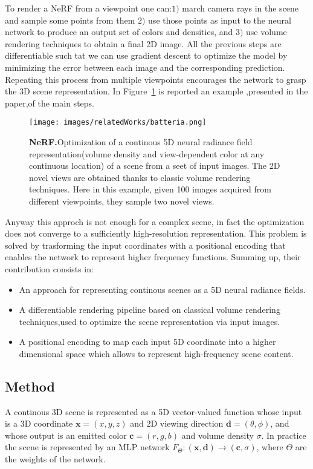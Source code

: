 To render a NeRF from a viewpoint one can:$1)$ march camera rays in the 
scene and sample some points from them $2)$ use those points as input to the neural
network to produce an output set of colors and densities, and $3)$ use volume 
rendering techniques to obtain a final 2D image. All the previous steps
are differentiable such tat we can use gradient descent to optimize the model
by minimizing the error between each image and the corresponding prediction.
Repeating this process from multiple viewpoints encourages the network to 
grasp the 3D scene representation. In Figure~\ref{fig:batteria} is reported an example
,presented in the paper,of the main steps.
\begin{figure}[t]
    \centering
    \texttt{[image: images/relatedWorks/batteria.png]} 
    \caption{\textbf{NeRF.}Optimization of a continous 5D neural radiance field
    representation(volume density and view-dependent color at any continuous location)
    of a scene from a seet of input images. The 2D novel views are obtained thanks
    to classic volume rendering techniques. Here in this example, given 100
    images acquired from different viewpoints, they sample two novel views.}\label{fig:batteria}
\end{figure}

Anyway this approch is not enough for a complex scene, in fact the optimization 
does not converge to a sufficiently high-resolution representation. This problem
is solved by trasforming the input coordinates with a positional encoding
that enables the network to represent higher frequency functions.
Summing up, their contribution consists in:
\begin{itemize}
    \item An approach for representing continous scenes as a 5D neural radiance fields.
    \item A differentiable rendering pipeline based on classical volume rendering
    techniques,used to optimize the scene representation via input images.
    \item A positional encoding to map each input 5D coordinate into a higher dimensional
    space which allows to represent high-frequency scene content.
\end{itemize}
\subsection{Method}
A continous 3D scene is represented as a 5D vector-valued function whose input is a 3D coordinate 
$\textbf{x}=(x,y,z)$ and 2D viewing direction $\textbf{d}=(\theta,\phi)$, and whose output is an emitted color 
$\textbf{c} = (r,g,b)$ and volume density $\sigma$. In practice the scene is represented by an MLP network
$F_{\Theta}:(\textbf{x},\textbf{d}) \rightarrow (\textbf{c},\sigma)$, where $\Theta$ are the weights of the network.

